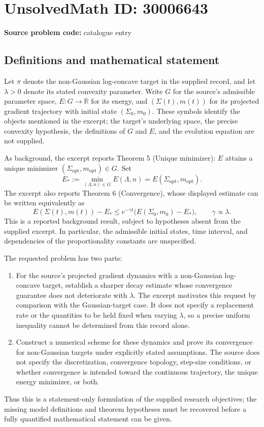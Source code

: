 \documentclass[11pt]{article}
\newcommand{\R}{\mathbb{R}}
\begin{document}
\section*{UnsolvedMath ID: 30006643}
\textbf{Source problem code:} catalogue entry
\subsection{Definitions and mathematical statement}
Let \(\pi\) denote the non-Gaussian log-concave target in the supplied record, and let \(\lambda>0\) denote its stated convexity parameter. Write \(G\) for the source's admissible parameter space, \(E\colon G\to\R\) for its energy, and \((\Sigma(t),m(t))\) for its projected gradient trajectory with initial state \((\Sigma_0,m_0)\). These symbols identify the objects mentioned in the excerpt; the target's underlying space, the precise convexity hypothesis, the definitions of \(G\) and \(E\), and the evolution equation are not supplied.

As background, the excerpt reports Theorem 5 (Unique minimizer): \(E\) attains a unique minimizer \((\Sigma_{\mathrm{opt}},m_{\mathrm{opt}})\in G\). Set
\[
E_*:=\min_{(\Lambda,n)\in G}E(\Lambda,n)
     =E(\Sigma_{\mathrm{opt}},m_{\mathrm{opt}}).
\]
The excerpt also reports Theorem 6 (Convergence), whose displayed estimate can be written equivalently as
\[
E(\Sigma(t),m(t))-E_*
\leq e^{-\gamma t}\bigl(E(\Sigma_0,m_0)-E_*\bigr),
\qquad \gamma\propto\lambda.
\]
This is a reported background result, subject to hypotheses absent from the supplied excerpt. In particular, the admissible initial states, time interval, and dependencies of the proportionality constants are unspecified.

The requested problem has two parts:
\begin{enumerate}
\item For the source's projected gradient dynamics with a non-Gaussian log-concave target, establish a sharper decay estimate whose convergence guarantee does not deteriorate with \(\lambda\). The excerpt motivates this request by comparison with the Gaussian-target case. It does not specify a replacement rate or the quantities to be held fixed when varying \(\lambda\), so a precise uniform inequality cannot be determined from this record alone.
\item Construct a numerical scheme for these dynamics and prove its convergence for non-Gaussian targets under explicitly stated assumptions. The source does not specify the discretization, convergence topology, step-size conditions, or whether convergence is intended toward the continuous trajectory, the unique energy minimizer, or both.
\end{enumerate}
Thus this is a statement-only formulation of the supplied research objectives; the missing model definitions and theorem hypotheses must be recovered before a fully quantified mathematical statement can be given.
\end{document}
